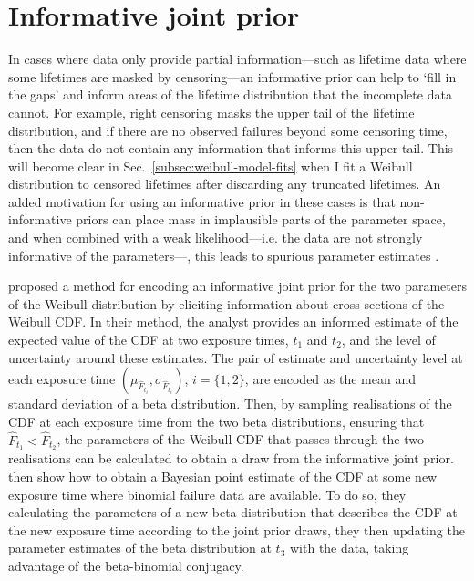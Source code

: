\section{Informative joint prior} \label{sec:weibull-joint-prior}

In cases where data only provide partial information---such as lifetime data where some lifetimes are masked by censoring---an informative prior can help to `fill in the gaps' and inform areas of the lifetime distribution that the incomplete data cannot. For example, right censoring masks the upper tail of the lifetime distribution, and if there are no observed failures beyond some censoring time, then the data do not contain any information that informs this upper tail. This will become clear in Sec.~\ref{subsec:weibull-model-fits} when I fit a Weibull distribution to censored lifetimes after discarding any truncated lifetimes. An added motivation for using an informative prior in these cases is that non-informative priors can place mass in implausible parts of the parameter space, and when combined with a weak likelihood---i.e. the data are not strongly informative of the parameters---, this leads to spurious parameter estimates \citep{tian2024}.

\citet{kaminskiy2005} proposed a method for encoding an informative joint prior for the two parameters of the Weibull distribution by eliciting information about cross sections of the Weibull CDF. In their method, the analyst provides an informed estimate of the expected value of the CDF at two exposure times, $t_1$ and $t_2$, and the level of uncertainty around these estimates. The pair of estimate and uncertainty level at each exposure time $(\mu_{\hat{F}_{t_i}}, \sigma_{\hat{F}_{t_i}})$, $i = \{1, 2\}$, are encoded as the mean and standard deviation of a beta distribution. Then, by sampling realisations of the CDF at each exposure time from the two beta distributions, ensuring that $\hat{F}_{t_1} < \hat{F}_{t_2}$, the parameters of the Weibull CDF that passes through the two realisations can be calculated to obtain a draw from the informative joint prior. \citet{kaminskiy2005} then show how to obtain a Bayesian point estimate of the CDF at some new exposure time where binomial failure data are available. To do so, they calculating the parameters of a new beta distribution that describes the CDF at the new exposure time according to the joint prior draws, they then updating the parameter estimates of the beta distribution at $t_3$ with the data, taking advantage of the beta-binomial conjugacy.

